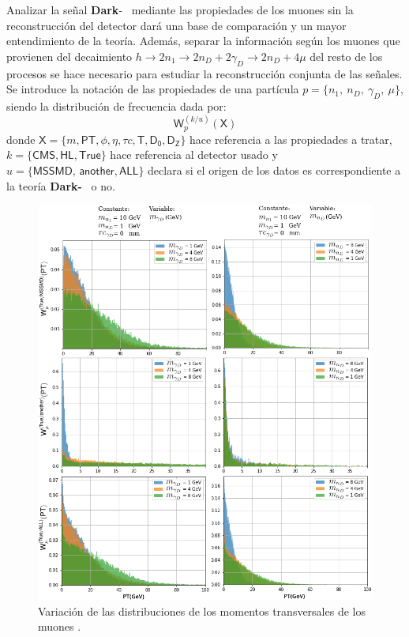 Analizar la señal \textbf{Dark}-\SUSY ~ mediante las propiedades de los muones sin la reconstrucción del detector dará una base de comparación y un mayor entendimiento de la teoría. Además, separar la información según los muones que provienen del decaimiento $h \rightarrow 2n_1 \rightarrow 2n_D + 2\gamma_D \rightarrow 2n_D + 4\mu$ del resto de los procesos se hace necesario para estudiar la reconstrucción conjunta de las señales. Se introduce la notación de las propiedades de una partícula $p=\{n_1, ~n_D, ~\gamma_D, ~\mu\}$, siendo la distribución de frecuencia dada por:
\begin{equation}
\textsf{W}^{(k/u)}_{p} (\textsf{X})
\end{equation}
 donde $\textsf{X}=\{m, \textsf{PT},\phi, \eta, \tau c , \textsf{T}, \textsf{D}_\textsf{0}, \textsf{D}_\textsf{Z}\}$ hace referencia a las propiedades a tratar, $k=\{\textsf{CMS}, \textsf{HL}, \textsf{True}\}$ hace referencia al detector usado y $u=\{\textsf{MSSMD, another},\textsf{ALL}\}$ declara si el origen de los datos es correspondiente a la teoría \textbf{Dark-}\SUSY ~ o no. 

\begin{figure}[!ht]
\centering
\includegraphics[width=.9\textwidth]{Simulacion/imagenes/True_PT4.png}
\caption{Variación de las distribuciones de los momentos transversales de los muones .}
\label{PT_mu_True}
\end{figure}

